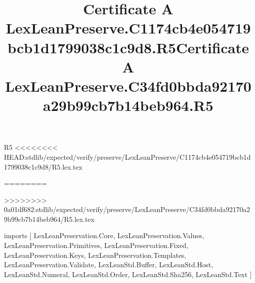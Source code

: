 \begin{lexlean}{R5}
<<<<<<<< HEAD:stdlib/expected/verify/preserve/LexLeanPreserve/C1174cb4e054719bcb1d1799038c1c9d8/R5.lex.tex
\title{Certificate A LexLeanPreserve.C1174cb4e054719bcb1d1799038c1c9d8.R5}
========
\title{Certificate A LexLeanPreserve.C34fd0bbda92170a29b99cb7b14beb964.R5}
>>>>>>>> 0a01df682:stdlib/expected/verify/preserve/LexLeanPreserve/C34fd0bbda92170a29b99cb7b14beb964/R5.lex.tex
\begin{coremodule}
imports [
  LexLeanPreservation.Core,
  LexLeanPreservation.Values,
  LexLeanPreservation.Primitives,
  LexLeanPreservation.Fixed,
  LexLeanPreservation.Keys,
  LexLeanPreservation.Templates,
  LexLeanPreservation.Validate,
  LexLeanStd.Buffer,
  LexLeanStd.Host,
  LexLeanStd.Numeral,
  LexLeanStd.Order,
  LexLeanStd.Sha256,
  LexLeanStd.Text
]


\end{coremodule}
\end{lexlean}
